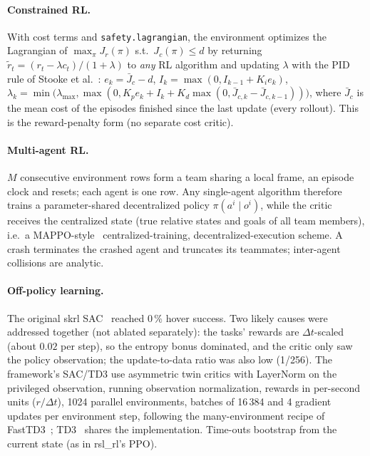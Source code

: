 \paragraph{Constrained RL.} With cost terms and \texttt{safety.lagrangian}, the environment optimizes the Lagrangian
of $\max_\pi J_r(\pi)$ s.t.\ $J_c(\pi)\le d$ by returning $\tilde r_t=(r_t-\lambda c_t)/(1+\lambda)$ to \emph{any} RL
algorithm and updating $\lambda$ with the PID rule of Stooke et al.~\cite{stooke2020pid}: $e_k=\bar J_c-d$,
$I_k=\max(0,I_{k-1}+K_ie_k)$, $\lambda_k=\min\!\big(\lambda_{\max},\max(0,K_pe_k+I_k+K_d\max(0,\bar J_{c,k}-\bar J_{c,k-1}))\big)$,
where $\bar J_c$ is the mean cost of the episodes finished since the last update (every rollout). This is the
reward-penalty form (no separate cost critic).

\paragraph{Multi-agent RL.} $M$ consecutive environment rows form a team sharing a local frame, an episode clock and
resets; each agent is one row. Any single-agent algorithm therefore trains a parameter-shared decentralized policy
$\pi(a^i\mid o^i)$, while the critic receives the centralized state (true relative states and goals of all team
members), i.e.\ a MAPPO-style~\cite{yu2022mappo} centralized-training, decentralized-execution scheme. A crash terminates the crashed
agent and truncates its teammates; inter-agent collisions are analytic.

\paragraph{Off-policy learning.} The original skrl SAC~\cite{haarnoja2018sac} reached 0\,\% hover success. Two likely causes were addressed
together (not ablated separately): the tasks' rewards are $\Delta t$-scaled (about $0.02$ per step), so the entropy
bonus dominated, and the critic only saw the policy observation; the update-to-data ratio was also low (1/256). The framework's SAC/TD3 use asymmetric twin critics with LayerNorm on the
privileged observation, running observation normalization, rewards in per-second units ($r/\Delta t$), 1024 parallel
environments, batches of 16\,384 and 4 gradient updates per environment step, following the many-environment recipe of FastTD3~\cite{seo2025fasttd3}; TD3~\cite{fujimoto2018td3} shares the implementation. Time-outs bootstrap from the current
state (as in rsl\_rl's PPO).

